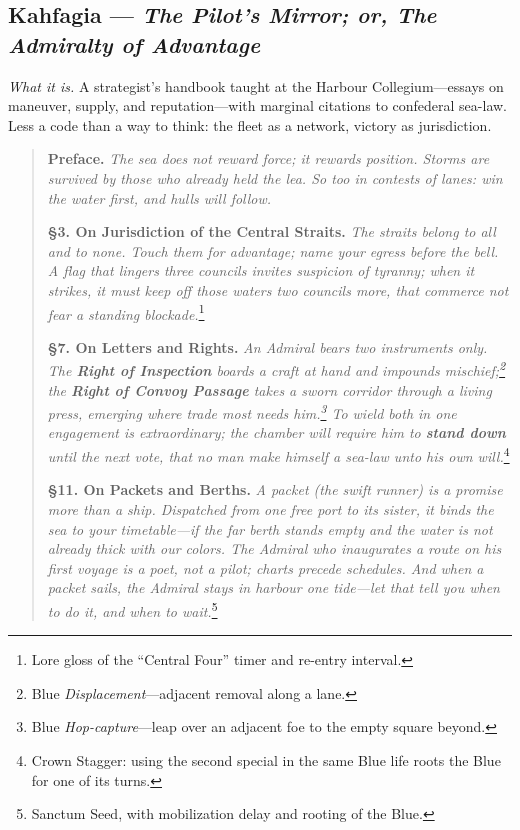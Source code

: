 \documentclass[11pt]{article}
\begin{document}
\clearpage

\subsection{Kahfagia — \textit{The Pilot’s Mirror; or, The Admiralty of Advantage}}
\textit{What it is.} A strategist’s handbook taught at the Harbour Collegium—essays on maneuver, supply, and reputation—with marginal citations to confederal sea-law. Less a code than a way to think: the fleet as a network, victory as jurisdiction.

\begin{quote}\small
\textbf{Preface.} \emph{The sea does not reward force; it rewards position. Storms are survived by those who already held the lea. So too in contests of lanes: win the water first, and hulls will follow.}

\medskip
\textbf{§3. On Jurisdiction of the Central Straits.} \emph{The straits belong to all and to none. Touch them for advantage; name your egress before the bell. A flag that lingers three councils invites suspicion of tyranny; when it strikes, it must keep off those waters two councils more, that commerce not fear a standing blockade.}\footnote{Lore gloss of the “Central Four” timer and re-entry interval.}

\medskip
\textbf{§7. On Letters and Rights.} \emph{An Admiral bears two instruments only. The \textbf{Right of Inspection} boards a craft at hand and impounds mischief;\footnote{Blue \emph{Displacement}—adjacent removal along a lane.} the \textbf{Right of Convoy Passage} takes a sworn corridor through a living press, emerging where trade most needs him.\footnote{Blue \emph{Hop-capture}—leap over an adjacent foe to the empty square beyond.} To wield both in one engagement is extraordinary; the chamber will require him to \textbf{stand down} until the next vote, that no man make himself a sea-law unto his own will.}\footnote{Crown Stagger: using the second special in the same Blue life roots the Blue for one of its turns.}

\medskip
\textbf{§11. On Packets and Berths.} \emph{A packet (the swift runner) is a promise more than a ship. Dispatched from one free port to its sister, it binds the sea to your timetable—if the far berth stands empty and the water is not already thick with our colors. The Admiral who inaugurates a route on his \emph{first} voyage is a poet, not a pilot; charts precede schedules. And when a packet sails, the Admiral stays in harbour one tide—let that tell you when to do it, and when to wait.}\footnote{Sanctum Seed, with mobilization delay and rooting of the Blue.}


\end{quote}
\end{document}
